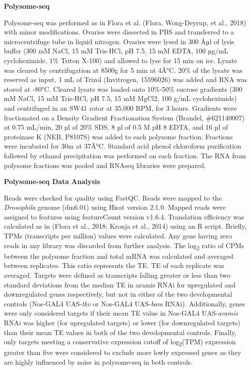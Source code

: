 \documentclass[12pt,oneside]{reedthesis}
\begin{document}
\textbf{Polysome-seq}

Polysome-seq was performed as in Flora et al. (Flora, Wong-Deyrup, et al., 2018) with
minor modifications. Ovaries were dissected in PBS and transferred to a
microcentrifuge tube in liquid nitrogen. Ovaries were lysed in 300 Âµl of
lysis buffer (300 mM NaCl, 15 mM Tris-HCl, pH 7.5, 15 mM EDTA, 100 µg/mL
cycloheximide, 1\% Triton X-100) and allowed to lyse for 15 min on ice.
Lysate was cleared by centrifugation at 8500g for 5 min at 4Â°C. 20\% of
the lysate was reserved as input, 1 mL of Trizol (Invitrogen, 15596026)
was added and RNA was stored at -80°C. Cleared lysate was loaded onto
10\%-50\% sucrose gradients (300 mM NaCl, 15 mM Tris-HCl, pH 7.5, 15 mM
MgCl2, 100 g/mL cycloheximide) and centrifuged in an SW41 rotor at
35,000 RPM, for 3 hours. Gradients were fractionated on a Density
Gradient Fractionation System (Brandel, \#621140007) at 0.75 mL/min, 20
µl of 20\% SDS, 8 µl of 0.5 M pH 8 EDTA, and 16 µl of proteinase K (NEB,
P8107S) was added to each polysome fraction. Fractions were incubated
for 30m at 37Â°C. Standard acid phenol chloroform purification followed
by ethanol precipitation was performed on each fraction. The RNA from
polysome fractions was pooled and RNAseq libraries were prepared.

\textbf{Polysome-seq Data Analysis}

Reads were checked for quality using FastQC. Reads were mapped to the
\emph{Drosophila} genome (dm6.01) using Hisat version 2.1.0. Mapped reads
were assigned to features using featureCount version v1.6.4. Translation
efficiency was calculated as in (Flora et al., 2018; Kronja et al.,
2014) using an R script. Briefly, TPMs (transcripts per million) values
were calculated. Any gene having zero reads in any library was discarded
from further analysis. The log\textsubscript{2} ratio of CPMs between the polysome
fraction and total mRNA was calculated and averaged between replicates.
This ratio represents the TE. TE of each replicate was averaged. Targets
were defined as transcripts falling greater or less than two standard
deviations from the median TE in aramis RNAi for upregulated and
downregulated genes respectively, but not in either of the two
developmental controls (Nos-GAL4 UAS-\emph{tkv} or Nos-GAL4 UAS-\emph{bam} RNAi).
Additionally, genes were only considered targets if their mean TE value
in Nos-GAL4 UAS-\emph{aramis} RNAi was higher (for upregulated targets) or
lower (for downregulated targets) than their mean TE values in both of
the two developmental controls. Finally, only targets meeting a
conservative expression cutoff of log\textsubscript{2}(TPM) expression greater than
five were considered to exclude more lowly expressed genes as they are
highly influenced by noise in polysome-seq in both controls.
\end{document}
